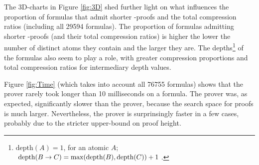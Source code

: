\documentclass{llncs}
\begin{document}
The 3D-charts in Figure \ref{fig:3D} shed further light on what influences the proportion of formulas that admit shorter {\NDd}-proofs and the total compression ratios (including all 29594 formulas). The proportion of formulas admitting shorter {\NDd}-proofs (and their total compression ratios) is higher the lower the number of distinct atoms they contain and the larger they are. The depths\footnote{$\mathrm{depth}(A) = 1$, for an atomic $A$; $\mathrm{depth}(B \rightarrow C) = \mathrm{max}(\mathrm{depth}(B), \mathrm{depth}(C)) + 1$.} of the formulas also seem to play a role, with greater compression proportions and total compression ratios for intermediary depth values.

Figure \ref{fig:Time} (which takes into account all 76755 formulas) shows that the {\ND} prover rarely took longer than 10 milliseconds on a formula. The {\NDd} prover was, as expected, significantly slower than the {\ND} prover, because the search space for {\NDd} proofs is much larger. Nevertheless, the {\NDd} prover is surprinsingly faster in a few cases, probably due to the stricter upper-bound on proof height. 

\begin{figure}[!ht]
        \centering
        
        \hfill
        \caption{}\label{fig:charts}
\end{figure}
\end{document}
